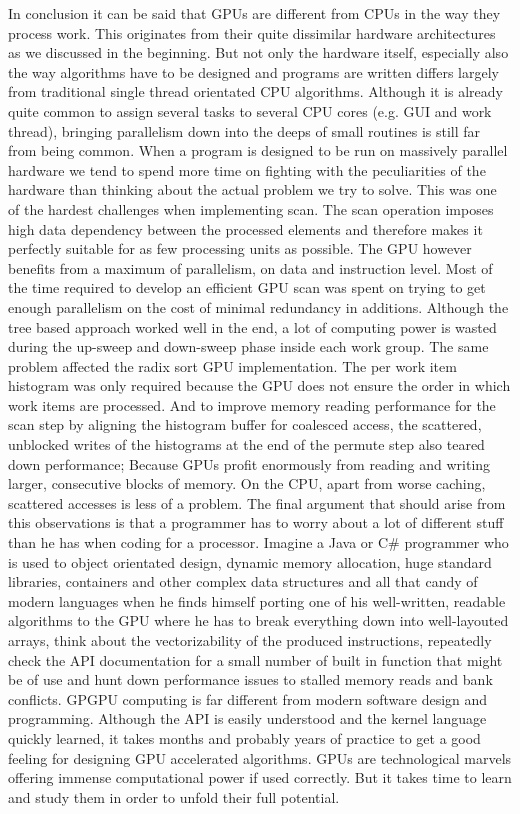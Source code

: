 In conclusion it can be said that GPUs are different from CPUs in the way they process work. This originates from their quite dissimilar hardware architectures as we discussed in the beginning. But not only the hardware itself, especially also the way algorithms have to be designed and programs are written differs largely from traditional single thread orientated CPU algorithms. Although it is already quite common to assign several tasks to several CPU cores (e.g. GUI and work thread), bringing parallelism down into the deeps of small routines is still far from being common. When a program is designed to be run on massively parallel hardware we tend to spend more time on fighting with the peculiarities of the hardware than thinking about the actual problem we try to solve. This was one of the hardest challenges when implementing scan. The scan operation imposes high data dependency between the processed elements and therefore makes it perfectly suitable for as few processing units as possible. The GPU however benefits from a maximum of parallelism, on data and instruction level. Most of the time required to develop an efficient GPU scan was spent on trying to get enough parallelism on the cost of minimal redundancy in additions. Although the tree based approach worked well in the end, a lot of computing power is wasted during the up-sweep and down-sweep phase inside each work group. The same problem affected the radix sort GPU implementation. The per work item histogram was only required because the GPU does not ensure the order in which work items are processed. And to improve memory reading performance for the scan step by aligning the histogram buffer for coalesced access, the scattered, unblocked writes of the histograms at the end of the permute step also teared down performance; Because GPUs profit enormously from reading and writing larger, consecutive blocks of memory. On the CPU, apart from worse caching, scattered accesses is less of a problem. The final argument that should arise from this observations is that a programmer has to worry about a lot of different stuff than he has when coding for a processor. Imagine a Java or C\# programmer who is used to object orientated design, dynamic memory allocation, huge standard libraries, containers and other complex data structures and all that candy of modern languages when he finds himself porting one of his well-written, readable algorithms to the GPU where he has to break everything down into well-layouted arrays, think about the vectorizability of the produced instructions, repeatedly check the API documentation for a small number of built in function that might be of use and hunt down performance issues to stalled memory reads and bank conflicts. GPGPU computing is far different from modern software design and programming. Although the API is easily understood and the kernel language quickly learned, it takes months and probably years of practice to get a good feeling for designing GPU accelerated algorithms. GPUs are technological marvels offering immense computational power if used correctly. But it takes time to learn and study them in order to unfold their full potential.

